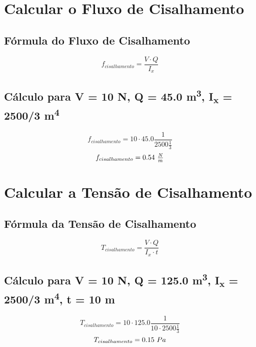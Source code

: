 \documentclass[a4paper,12pt]{article}%
\begin{document}
%
\section{Calcular o Fluxo de Cisalhamento}%
\label{sec:CalcularoFluxodeCisalhamento}%
\subsection{Fórmula do Fluxo de Cisalhamento}%
\label{subsec:FrmuladoFluxodeCisalhamento}%
\begin{dmath*}%
f_{cisalhamento} = \frac{V \cdot Q}{I_x}%
\end{dmath*}

%
\subsection{Cálculo para V = 10 N, Q = 45.0 m\textsuperscript{3}, I\textsubscript{x} = 2500/3 m\textsuperscript{4}}%
\label{subsec:ClculoparaV=10N,Q=45.0mtextsuperscript3,Itextsubscriptx=2500/3mtextsuperscript4}%
\begin{dmath*}%
f_{cisalhamento} =10 \cdot 45.0 \frac{1}{2500 \frac{1}{3}}%
\end{dmath*}%
\begin{dmath*}%
f_{cisalhamento} =0.54$ $\frac{N}{m}%
\end{dmath*}

%
\section{Calcular a Tensão de Cisalhamento}%
\label{sec:CalcularaTensodeCisalhamento}%
\subsection{Fórmula da Tensão de Cisalhamento}%
\label{subsec:FrmuladaTensodeCisalhamento}%
\begin{dmath*}%
T_{cisalhamento} = \frac{V \cdot Q}{I_x \cdot t}%
\end{dmath*}

%
\subsection{Cálculo para V = 10 N, Q = 125.0 m\textsuperscript{3}, I\textsubscript{x} = 2500/3 m\textsuperscript{4}, t = 10 m}%
\label{subsec:ClculoparaV=10N,Q=125.0mtextsuperscript3,Itextsubscriptx=2500/3mtextsuperscript4,t=10m}%
\begin{dmath*}%
T_{cisalhamento} =10 \cdot 125.0 \frac{1}{10 \cdot 2500 \frac{1}{3}}%
\end{dmath*}%
\begin{dmath*}%
T_{cisalhamento} =0.15$ $Pa%
\end{dmath*}

%
\end{document}
